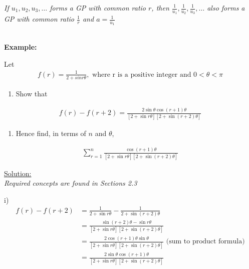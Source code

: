 \documentclass[12pt, a4paper, titlepage]{article}
\begin{document}
\emph{If $u_1, u_2, u_3, \dots$ forms a GP with common ratio $r$, then $\frac{1}{u_1}, \frac{1}{u_2}, \frac{1}{u_3}, \dots$ also forms a GP with common ratio $\frac{1}{r}$ and $a = \frac{1}{u_1}$}

\textbf{\\ Example:}

Let
\begin{align*}
    f(r) = \frac{1}{2 + sin r\theta}, \text{ where r is a positive integer and } 0 < \theta < \pi
\end{align*}

\begin{enumerate}[label=(\roman*)]
    \item Show that
\end{enumerate}
\begin{align*}
    f(r) - f(r + 2) = \frac{2\sin \theta \cos (r+1)\theta}{[2 + \sin r\theta][2 + \sin (r + 2)\theta]}
\end{align*}
\begin{enumerate}[resume, label=(\roman*)]
    \item Hence find, in terms of $n$ and $\theta$,
\end{enumerate}
\begin{align*}
    \sum^n_{r = 1} \frac{\cos (r+1)\theta}{[2 + \sin r\theta][2 + \sin (r + 2)\theta]}
\end{align*}

\begin{flushright}
\end{flushright}

\underline{Solution:} \\
\emph{Required concepts are found in Sections 2.3}

i)
\begin{align*}
    f(r) - f(r + 2) &= \frac{1}{2 + \sin r\theta} - \frac{1}{2 + \sin (r + 2)\theta} \\
    &= \frac{\sin (r + 2)\theta - \sin r\theta}{[2 + \sin r\theta][2 + \sin (r + 2)\theta]} \\
    &= \frac{2\cos (r+1)\theta \sin\theta}{[2 + \sin r\theta][2 + \sin (r + 2)\theta]} \text{ (sum to product formula)} \\
    &=\frac{2\sin \theta \cos (r+1)\theta}{[2 + \sin r\theta][2 + \sin (r + 2)\theta]}
\end{align*}
\end{document}
